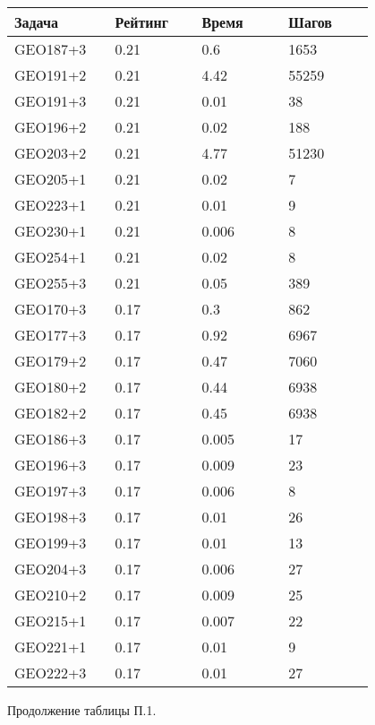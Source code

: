 \begin{longtable}[H]{|p{0.2\linewidth}|p{0.2\linewidth}|p{0.2\linewidth}|p{0.2\linewidth}|}
\hline
\textbf{Задача} & \textbf{Рейтинг} & \textbf{Время} & \textbf{Шагов} \\
\hline
GEO187+3 & 0.21 & 0.6 & 1653 \\
\hline
GEO191+2 & 0.21 & 4.42 & 55259 \\
\hline
GEO191+3 & 0.21 & 0.01 & 38 \\
\hline
GEO196+2 & 0.21 & 0.02 & 188 \\
\hline
GEO203+2 & 0.21 & 4.77 & 51230 \\
\hline
GEO205+1 & 0.21 & 0.02 & 7 \\
\hline
GEO223+1 & 0.21 & 0.01 & 9 \\
\hline
GEO230+1 & 0.21 & 0.006 & 8 \\
\hline
GEO254+1 & 0.21 & 0.02 & 8 \\
\hline
GEO255+3 & 0.21 & 0.05 & 389 \\
\hline
GEO170+3 & 0.17 & 0.3 & 862 \\
\hline
GEO177+3 & 0.17 & 0.92 & 6967 \\
\hline
GEO179+2 & 0.17 & 0.47 & 7060 \\
\hline
GEO180+2 & 0.17 & 0.44 & 6938 \\
\hline
GEO182+2 & 0.17 & 0.45 & 6938 \\
\hline
GEO186+3 & 0.17 &  0.005 & 17 \\
\hline
GEO196+3 & 0.17 & 0.009 & 23 \\
\hline
GEO197+3 & 0.17 & 0.006 & 8 \\
\hline
GEO198+3 & 0.17 & 0.01 & 26 \\
\hline
GEO199+3 & 0.17 & 0.01 & 13 \\
\hline
GEO204+3 & 0.17 & 0.006 & 27 \\
\hline
GEO210+2 & 0.17 & 0.009 & 25 \\
\hline
GEO215+1 & 0.17 & 0.007 & 22 \\
\hline
GEO221+1 & 0.17 & 0.01 & 9  \\
\hline
GEO222+3 & 0.17 & 0.01 & 27  \\
\hline
\end{longtable}
\begin{center}
Продолжение таблицы П.1.
\end{center}

